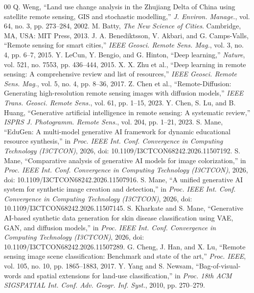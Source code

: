 \documentclass[journal]{IEEEtran}
\begin{document}
\begin{thebibliography}{00}
 Q. Weng, ``Land use change analysis in the Zhujiang Delta of China using satellite remote sensing, GIS and stochastic modelling,'' \textit{J. Environ. Manage.}, vol. 64, no. 3, pp. 273--284, 2002.
 M. Batty, \textit{The New Science of Cities}. Cambridge, MA, USA: MIT Press, 2013.
 J. A. Benediktsson, V. Akbari, and G. Camps-Valls, ``Remote sensing for smart cities,'' \textit{IEEE Geosci. Remote Sens. Mag.}, vol. 3, no. 4, pp. 6--7, 2015.
 Y. LeCun, Y. Bengio, and G. Hinton, ``Deep learning,'' \textit{Nature}, vol. 521, no. 7553, pp. 436--444, 2015.
 X. X. Zhu et al., ``Deep learning in remote sensing: A comprehensive review and list of resources,'' \textit{IEEE Geosci. Remote Sens. Mag.}, vol. 5, no. 4, pp. 8--36, 2017.
 Z. Chen et al., ``Remote-Diffusion: Generating high-resolution remote sensing images with diffusion models,'' \textit{IEEE Trans. Geosci. Remote Sens.}, vol. 61, pp. 1--15, 2023.
 Y. Chen, S. Lu, and B. Huang, ``Generative artificial intelligence in remote sensing: A systematic review,'' \textit{ISPRS J. Photogramm. Remote Sens.}, vol. 204, pp. 1--21, 2023.
 S. Mane, ``EduGen: A multi-model generative AI framework for dynamic educational resource synthesis,'' in \textit{Proc. IEEE Int. Conf. Convergence in Computing Technology (I3CTCON)}, 2026, doi: 10.1109/I3CTCON68242.2026.11507192.
 S. Mane, ``Comparative analysis of generative AI models for image colorization,'' in \textit{Proc. IEEE Int. Conf. Convergence in Computing Technology (I3CTCON)}, 2026, doi: 10.1109/I3CTCON68242.2026.11507916.
 S. Mane, ``A unified generative AI system for synthetic image creation and detection,'' in \textit{Proc. IEEE Int. Conf. Convergence in Computing Technology (I3CTCON)}, 2026, doi: 10.1109/I3CTCON68242.2026.11507145.
 S. Kharkate and S. Mane, ``Generative AI-based synthetic data generation for skin disease classification using VAE, GAN, and diffusion models,'' in \textit{Proc. IEEE Int. Conf. Convergence in Computing Technology (I3CTCON)}, 2026, doi: 10.1109/I3CTCON68242.2026.11507289.
 G. Cheng, J. Han, and X. Lu, ``Remote sensing image scene classification: Benchmark and state of the art,'' \textit{Proc. IEEE}, vol. 105, no. 10, pp. 1865--1883, 2017.
 Y. Yang and S. Newsam, ``Bag-of-visual-words and spatial extensions for land-use classification,'' in \textit{Proc. 18th ACM SIGSPATIAL Int. Conf. Adv. Geogr. Inf. Syst.}, 2010, pp. 270--279.

\end{thebibliography}
\end{document}
